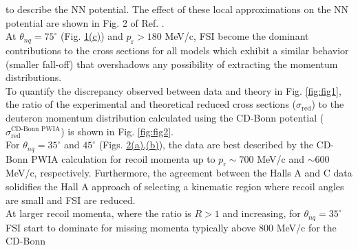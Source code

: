 to describe the NN potential. The effect of these local approximations on the NN potential are shown in Fig. 2 of Ref. \cite{PhysRevC.63.024001}. \\
\indent At $\theta_{nq}=75^{\circ}$ (Fig. \hyperref[fig:fig1]{1(c)}) and $p_{\mathrm{r}}>180$ MeV/c, FSI become the dominant contributions to the cross sections for all models which exhibit a similar
behavior (smaller fall-off) that overshadows any possibility of extracting the momentum distributions.\\
\indent To quantify the discrepancy observed between data and theory in Fig. \ref{fig:fig1}, the ratio of the experimental and theoretical reduced cross sections ($\sigma_{\mathrm{red}}$) to the
deuteron momentum distribution  calculated using the CD-Bonn potential ($\sigma^{\text{CD-Bonn PWIA}}_{\mathrm{red}}$) \cite{PhysRevC.63.024001} is shown in Fig. \ref{fig:fig2}. \\
\indent For $\theta_{nq}=35^{\circ}$ and $45^{\circ}$ (Figs. \hyperref[fig:fig2]{2(a),(b)}), the data are best described by the CD-Bonn PWIA calculation for recoil momenta up
to $p_{\mathrm{r}}\sim700$ MeV/c and $\sim600$ MeV/c, respectively. Furthermore, the agreement between the Halls A and C data solidifies the Hall A approach of selecting a kinematic
region where recoil angles are small and FSI are reduced. \\
\indent At larger recoil momenta, where the ratio is $R>1$ and increasing, for $\theta_{nq}=35^{\circ}$ FSI start to dominate for
missing momenta typically above 800 MeV/c for the CD-Bonn
